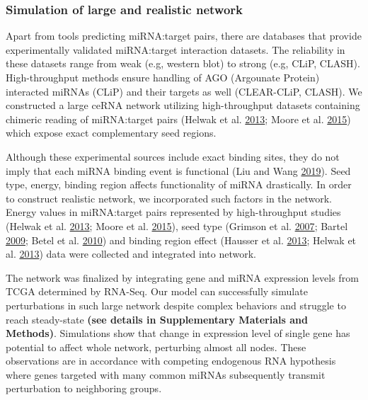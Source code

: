 \documentclass[]{article}
\begin{document}
\hypertarget{simulation-of-large-and-realistic-network}{%
\subsubsection{Simulation of large and realistic
network}\label{simulation-of-large-and-realistic-network}}

Apart from tools predicting miRNA:target pairs, there are databases that
provide experimentally validated miRNA:target interaction datasets. The
reliability in these datasets range from weak (e.g, western blot) to
strong (e.g, CLiP, CLASH). High-throughput methods ensure handling of
AGO (Argounate Protein) interacted miRNAs (CLiP) and their targets as
well (CLEAR-CLiP, CLASH). We constructed a large ceRNA network utilizing
high-throughput datasets containing chimeric reading of miRNA:target
pairs (Helwak et al. \protect\hyperlink{ref-helwak_mapping_2013}{2013};
Moore et al. \protect\hyperlink{ref-moore_mirnatarget_2015}{2015}) which
expose exact complementary seed regions.

Although these experimental sources include exact binding sites, they do
not imply that each miRNA binding event is functional (Liu and Wang
\protect\hyperlink{ref-liu2019prediction}{2019}). Seed type, energy,
binding region affects functionality of miRNA drastically. In order to
construct realistic network, we incorporated such factors in the
network. Energy values in miRNA:target pairs represented by
high-throughput studies (Helwak et al.
\protect\hyperlink{ref-helwak_mapping_2013}{2013}; Moore et al.
\protect\hyperlink{ref-moore_mirnatarget_2015}{2015}), seed type
(Grimson et al. \protect\hyperlink{ref-grimson_microrna_2007}{2007};
Bartel \protect\hyperlink{ref-bartel_micrornas:_2009}{2009}; Betel et
al. \protect\hyperlink{ref-betel2010comprehensive}{2010}) and binding
region effect (Hausser et al.
\protect\hyperlink{ref-hausser_analysis_2013}{2013}; Helwak et al.
\protect\hyperlink{ref-helwak_mapping_2013}{2013}) data were collected
and integrated into network.

The network was finalized by integrating gene and miRNA expression
levels from TCGA determined by RNA-Seq. Our model can successfully
simulate perturbations in such large network despite complex behaviors
and struggle to reach steady-state \textbf{(see details in Supplementary
Materials and Methods)}. Simulations show that change in expression
level of single gene has potential to affect whole network, perturbing
almost all nodes. These observations are in accordance with competing
endogenous RNA hypothesis where genes targeted with many common miRNAs
subsequently transmit perturbation to neighboring groups.
\end{document}
